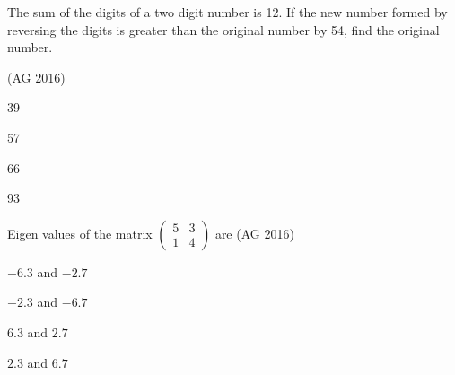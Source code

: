 \item 
The sum of the digits of a two digit number is 12. If the new number formed by reversing the digits is greater than the original number by 54, find the original number.

\hfill(AG 2016)
\begin{enumerate}
\begin{multicols}{4}
\item 39
\item 57
\item 66
\item 93
\end{multicols}
\end{enumerate}
\item 
Eigen values of the matrix
$\begin{pmatrix} 5 & 3 \\ 1 & 4 \end{pmatrix}$ are
\hfill(AG 2016)
\begin{enumerate}
\begin{multicols}{4}
\item $-6.3$ and $-2.7$
\item $-2.3$ and $-6.7$
\item $6.3$ and $2.7$
\item $2.3$ and $6.7$
\end{multicols}
\end{enumerate}

